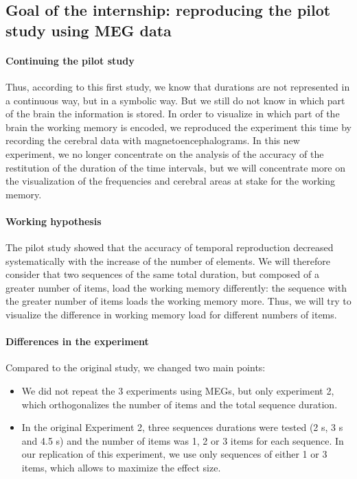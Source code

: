 \subsection{Goal of the internship: reproducing the pilot study using MEG data}

\paragraph{Continuing the pilot study}
Thus, according to this first study, we know that durations are not represented in a continuous way, but in a symbolic way. But we still do not know in which part of the brain the information is stored. In order to visualize in which part of the brain the working memory is encoded, we reproduced the experiment this time by recording the cerebral data with magnetoencephalograms. In this new experiment, we no longer concentrate on the analysis of the accuracy of the restitution of the duration of the time intervals, but we will concentrate more on the visualization of the frequencies and cerebral areas at stake for the working memory.

\paragraph{Working hypothesis}
The pilot study showed that the accuracy of temporal reproduction decreased systematically with the increase of the number of elements. We will therefore consider that two sequences of the same total duration, but composed of a greater number of items, load the working memory differently: the sequence with the greater number of items loads the working memory more. Thus, we will try to visualize the difference in working memory load for different numbers of items.

\paragraph{Differences in the experiment}
Compared to the original study, we changed two main points:

\begin{itemize}
    \item We did not repeat the 3 experiments using MEGs, but only experiment 2, which orthogonalizes the number of items and the total sequence duration.
    \item In the original Experiment 2, three sequences durations were tested (2 s, 3 s and 4.5 s) and the number of items was 1, 2 or 3 items for each sequence. In our replication of this experiment, we use only sequences of either 1 or 3 items, which allows to maximize the effect size.
\end{itemize}


